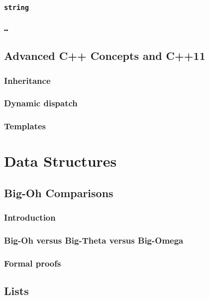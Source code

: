 \documentclass[11pt,twoside]{book}
\begin{document}
\section{\tt string}

\section{\tt \ldots}


\chapter{Advanced C++ Concepts and C++11}

\section{Inheritance}

\section{Dynamic dispatch}

\section{Templates}


\part{Data Structures}

\chapter{Big-Oh Comparisons}

\section{Introduction}

\section{Big-Oh versus Big-Theta versus Big-Omega}

\section{Formal proofs}


\chapter{Lists}
\end{document}

